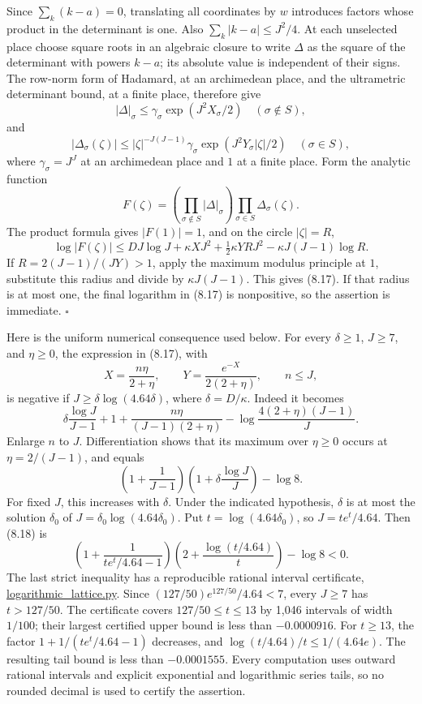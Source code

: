 \documentclass[
  11pt,
  a4paper,
]{article}
\begin{document}
Since \(\sum_k(k-a)=0\), translating all coordinates by \(w\) introduces
factors whose product in the determinant is one. Also
\(\sum_k|k-a|\le J^2/4\). At each unselected place choose square roots
in an algebraic closure to write \(\Delta\) as the square of the
determinant with powers \(k-a\); its absolute value is independent of
their signs. The row-norm form of Hadamard, at an archimedean place, and
the ultrametric determinant bound, at a finite place, therefore give \[
|\Delta|_\sigma\le\gamma_\sigma
\exp(J^2X_\sigma/2)\quad(\sigma\notin S),
\] and \[
|\Delta_\sigma(\zeta)|\le
|\zeta|^{-J(J-1)}\gamma_\sigma
\exp(J^2Y_\sigma|\zeta|/2)\quad(\sigma\in S),
\] where \(\gamma_\sigma=J^J\) at an archimedean place and \(1\) at a
finite place. Form the analytic function \[
F(\zeta)=
\left(\prod_{\sigma\notin S}|\Delta|_\sigma\right)
\prod_{\sigma\in S}\Delta_\sigma(\zeta).
\] The product formula gives \(|F(1)|=1\), and on the circle
\(|\zeta|=R\), \[
\log|F(\zeta)|
\le DJ\log J+\kappa XJ^2
+\tfrac12\kappa YRJ^2-\kappa J(J-1)\log R.
\] If \(R=2(J-1)/(JY)>1\), apply the maximum modulus principle at \(1\),
substitute this radius and divide by \(\kappa J(J-1)\). This gives
(8.17). If that radius is at most one, the final logarithm in (8.17) is
nonpositive, so the assertion is immediate. \(\square\)

Here is the uniform numerical consequence used below. For every
\(\delta\ge1\), \(J\ge7\), and \(\eta\ge0\), the expression in (8.17),
with \[
X=\frac{n\eta}{2+\eta},\qquad
Y=\frac{e^{-X}}{2(2+\eta)},\qquad n\le J,
\] is negative if \(J\ge\delta\log(4.64\delta)\), where
\(\delta=D/\kappa\). Indeed it becomes \[
\delta\frac{\log J}{J-1}+1+
\frac{n\eta}{(J-1)(2+\eta)}
-\log\frac{4(2+\eta)(J-1)}J .
\] Enlarge \(n\) to \(J\). Differentiation shows that its maximum over
\(\eta\ge0\) occurs at \(\eta=2/(J-1)\), and equals \[
\left(1+\frac1{J-1}\right)
\left(1+\delta\frac{\log J}J\right)-\log8.
\tag{8.18}
\] For fixed \(J\), this increases with \(\delta\). Under the indicated
hypothesis, \(\delta\) is at most the solution \(\delta_0\) of
\(J=\delta_0\log(4.64\delta_0)\). Put \(t=\log(4.64\delta_0)\), so
\(J=t e^t/4.64\). Then (8.18) is \[
\left(1+\frac1{t e^t/4.64-1}\right)
\left(2+\frac{\log(t/4.64)}t\right)-\log8<0.
\tag{8.19}
\] The last strict inequality has a reproducible rational interval
certificate,
\href{https://kokunoyumeto.github.io/open-math-courses-public/courses/TR-BAKER/verification/logarithmic_lattice.py}{logarithmic\_lattice.py}.
Since \((127/50)e^{127/50}/4.64<7\), every \(J\ge7\) has \(t>127/50\).
The certificate covers \(127/50\le t\le13\) by 1,046 intervals of width
\(1/100\); their largest certified upper bound is less than
\(-0.0000916\). For \(t\ge13\), the factor \(1+1/(t e^t/4.64-1)\)
decreases, and \(\log(t/4.64)/t\le1/(4.64e)\). The resulting tail bound
is less than \(-0.0001555\). Every computation uses outward rational
intervals and explicit exponential and logarithmic series tails, so no
rounded decimal is used to certify the assertion.
\end{document}
